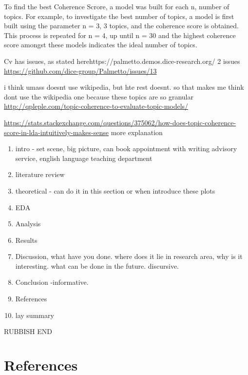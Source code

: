 \documentclass[
]{article}
\providecommand{\tightlist}{%
  \setlength{\itemsep}{0pt}\setlength{\parskip}{0pt}}
\begin{document}
To find the best Coherence Scrore, a model was built for each n, number
of topics. For example, to investigate the best number of topics, a
model is first built using the parameter n = 3, 3 topics, and the
coherence score is obtained. This process is repeated for n = 4, up
until n = 30 and the highest coherence score amongst these models
indicates the ideal number of topics.

Cv has issues, as stated herehttps://palmetto.demos.dice-research.org/ 2
issues \url{https://github.com/dice-group/Palmetto/issues/13}

i think umass doesnt use wikipedia, but hte rest doesnt. so that makes
me think dont use the wikipedia one because these topics are so granular
\url{http://qpleple.com/topic-coherence-to-evaluate-topic-models/}

\url{https://stats.stackexchange.com/questions/375062/how-does-topic-coherence-score-in-lda-intuitively-makes-sense}
more explanation

\begin{enumerate}
\def\labelenumi{\arabic{enumi}.}
\tightlist
\item
  intro - set scene, big picture, can book appointment with writing
  advisory service, english language teaching department
\item
  literature review
\item
  theoretical - can do it in this section or when introduce these plots
\item
  EDA
\item
  Analysis
\item
  Results
\item
  Discussion, what have you done. where does it lie in research area,
  why is it interesting. what can be done in the future. discursive.
\item
  Conclusion -informative.
\item
  References
\item
  lay summary
\end{enumerate}

RUBBISH END

\hypertarget{references}{%
\section*{References}\label{references}}
\end{document}
